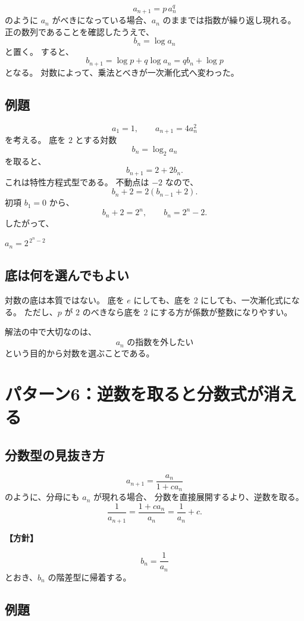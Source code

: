 \[
  a_{n+1}=p\,a_n^q
\]
のように $a_n$ がべきになっている場合、$a_n$ のままでは指数が繰り返し現れる。
正の数列であることを確認したうえで、
\[
  b_n=\log a_n
\]
と置く。
すると、
\[
  b_{n+1}
  =\log p+q\log a_n
  =q b_n+\log p
\]
となる。
対数によって、乗法とべきが一次漸化式へ変わった。

\subsection{例題}

\[
  a_1=1,\qquad a_{n+1}=4a_n^2
\]
を考える。
底を $2$ とする対数
\[
  b_n=\log_2a_n
\]
を取ると、
\[
  b_{n+1}=2+2b_n.
\]
これは特性方程式型である。
不動点は $-2$ なので、
\[
  b_n+2=2(b_{n-1}+2).
\]
初項 $b_1=0$ から、
\[
  b_n+2=2^n,
  \qquad
  b_n=2^n-2.
\]
したがって、
\begin{mdquote}
  $a_n=2^{\,2^n-2}$
\end{mdquote}

\subsection{底は何を選んでもよい}

対数の底は本質ではない。
底を $e$ にしても、底を $2$ にしても、一次漸化式になる。
ただし、$p$ が $2$ のべきなら底を $2$ にする方が係数が整数になりやすい。

解法の中で大切なのは、
\[
  a_n\text{ の指数を外したい}
\]
という目的から対数を選ぶことである。

\section{パターン6：逆数を取ると分数式が消える}

\subsection{分数型の見抜き方}

\[
  a_{n+1}=\frac{a_n}{1+ca_n}
\]
のように、分母にも $a_n$ が現れる場合、
分数を直接展開するより、逆数を取る。
\[
  \frac1{a_{n+1}}
  =\frac{1+ca_n}{a_n}
  =\frac1{a_n}+c.
\]

\noindent\textbf{【方針】}

\[
  b_n=\frac1{a_n}
\]
とおき、$b_n$ の階差型に帰着する。

\subsection{例題}

